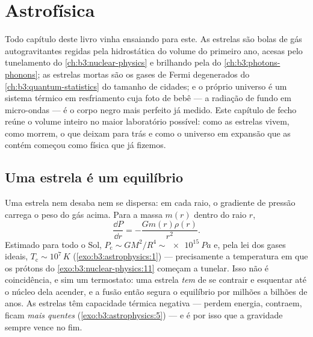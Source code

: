 \chapter{Astrofísica}\label{ch:b3:astrophysics}


Todo capítulo deste livro vinha ensaiando para este. As estrelas
são bolas de gás autogravitantes regidas pela hidrostática do volume do
primeiro ano, acesas pelo tunelamento do \cref{ch:b3:nuclear-physics} e
brilhando pela  do \cref{ch:b3:photons-phonons}; as estrelas
mortas são os gases de Fermi degenerados do
\cref{ch:b3:quantum-statistics} do tamanho de cidades;
e o próprio universo é um sistema térmico em resfriamento cuja
foto de bebê --- a radiação de fundo em micro-ondas --- é o corpo negro
mais perfeito já medido. Este capítulo de fecho reúne o volume
inteiro no maior laboratório possível: como as estrelas vivem, como
morrem, o que deixam para trás e como o universo em expansão
que as contém começou como física que já fizemos.

\section{Uma estrela é um equilíbrio}

\begin{proposition}\label{prop:b3:astrophysics:hydrostatic}
Uma estrela nem desaba nem se dispersa: em cada raio, o
gradiente de pressão carrega o peso do gás acima. Para a
massa $m(r)$ dentro do raio $r$,
\[
\frac{\dd P}{\dd r} = -\frac{Gm(r)\rho(r)}{r^2} .
\]
Estimado para todo o Sol, $P_{\text{c}} \sim GM^2/R^4 \sim
\qty{e15}{Pa}$ e, pela lei dos gases ideais, $T_{\text{c}} \sim
10^7\,\unit{K}$ (\cref{exo:b3:astrophysics:1}) --- precisamente a
temperatura em que os prótons do \cref{exo:b3:nuclear-physics:11}
começam a tunelar. Isso não é coincidência, e sim um termostato: uma
estrela \emph{tem} de se contrair e esquentar até o núcleo dela acender,
e a fusão então segura o equilíbrio por milhões a bilhões de anos. As
estrelas têm capacidade térmica negativa --- perdem energia, contraem,
ficam \emph{mais quentes} (\cref{exo:b3:astrophysics:5}) --- e é por isso
que a gravidade sempre vence no fim.
\end{proposition}

